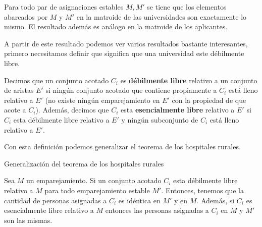 \begin{teo}
\label{help}
Para todo par de asignaciones estables $M,M'$ se tiene que los elementos abarcados por $M$ y $M'$ en la matroide de las universidades son exactamente lo mismo. El resultado además es análogo en la matroide de los aplicantes. 
\end{teo}

A partir de este resultado podemos ver varios resultados bastante interesantes, primero necesitamos definir que significa que una universidad este débilmente libre. 

\begin{dfn}
Decimos que un conjunto acotado $C_i$ es \textbf{débilmente libre} relativo a un conjunto de aristas $E'$ si ningún conjunto acotado que contiene propiamente a $C_i$ está lleno relativo a $E'$ (no existe ningún emparejamiento en $E'$ con la propiedad de que acote a $C_i$). Además, decimos que $C_i$ esta \textbf{esencialmente libre} relativo a $E'$ si $C_i$ esta débilmente libre relativo a $E'$ y ningún subconjunto de $C_i$ está lleno relativo a $E'$. 
\end{dfn}

Con esta definición podemos generalizar el teorema de los hospitales rurales. 

\begin{teo}{Generalización del teorema de los hospitales rurales}

Sea $M$ un emparejamiento. Si un conjunto acotado $C_i$ esta débilmente libre relativo a $M$ para todo emparejamiento estable $M'$. Entonces, tenemos que la cantidad de personas asignadas a $C_i$ es idéntica en $M'$ y en $M$. Además, si $C_i$ es esencialmente libre relativo a $M$ entonces las personas asignadas a $C_i$ en $M$ y $M'$ son las mismas. 
\end{teo}

